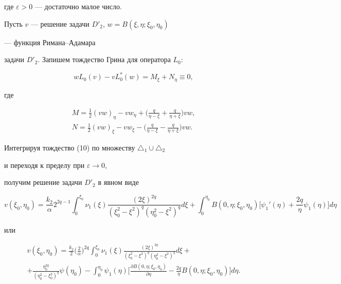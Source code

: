 где $\varepsilon>0$ --- достаточно малое число.


Пусть $v$ --- решение задачи $D'_2$, $w=B(\xi,\eta;\xi_0,\eta_0)$ 


--- функция Римана--Адамара


задачи $D'_2$. Запишем тождество Грина для оператора $L_0$:


\begin{equation}


w L_0(v)-v L^*_0(w)=M_\xi+N_\eta\equiv 0,


\end{equation}


где 


\begin{gather*}


M=\frac{1}{2}(v w)_\eta - v w_\eta +\bigg(\frac{q}{\eta-\xi}+


\frac{q}{\eta+\xi}\bigg)vw,\\


N=\frac{1}{2}(v w)_\xi - v w_\xi -\bigg(\frac{q}{\eta-\xi}-


\frac{q}{\eta+\xi}\bigg)vw.


\end{gather*}


 


Интегрируя тождество (10) по множеству $\triangle_1\cup\triangle_2$


и переходя к пределу при $\varepsilon \to 0$, 


получим решение задачи $D'_2$ в явном виде


\begin{equation}


v(\xi_0,\eta_0)=\frac{k_2}{\alpha}2^{2q-1}


\int_0^{\xi_0} \nu_1(\xi) \frac{(2\xi)^{2q}}


{(\xi_0^2-\xi^2)^q(\eta_0^2-\xi^2)^q}d\xi+


\int_0^{\eta_0} B(0,\eta;\xi_0,\eta_0) \bigg[\psi_1 '(\eta)


+\frac{2q}{\eta} \psi_1(\eta)\bigg] d\eta


\end{equation}


или


\begin{multline}


v(\xi_0,\eta_0)=\frac{k_2}{2}


\bigg(\frac{2}{\alpha  }\bigg)^{2q}


\int_0^{\xi_0} \nu_1(\xi) \frac{(2\xi)^{2q}}


{(\xi_0^2-\xi^2)^q(\eta_0^2-\xi^2)^q}d\xi+ \\


+\frac{\eta_0^{2q}}{(\eta_0^2-\xi_0^2)^q} \psi(\eta_0)-


\int_0^{\eta_0} \psi_1(\eta)


\bigg[\frac{\partial B(0,\eta;\xi_0,\eta_0)}{\partial \eta}


-\frac{2q}{\eta} B(0,\eta;\xi_0,\eta_0)\bigg] d\eta.


\end{multline}





